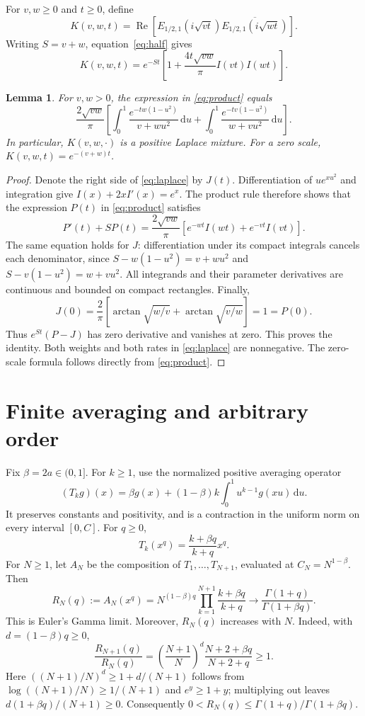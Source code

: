 \documentclass[11pt]{article}
\newtheorem{lemma}[theorem]{Lemma}
\newcommand{\dd}{\,\mathrm{d}}
\begin{document}
For $v,w\geq0$ and $t\geq0$, define
\[
 K(v,w,t)=\operatorname{Re}\!\left[
 E_{1/2,1}(i\sqrt{vt})\overline{E_{1/2,1}(i\sqrt{wt})}\right].
\]
Writing $S=v+w$, equation~\eqref{eq:half} gives
\begin{equation}\label{eq:product}
 K(v,w,t)=e^{-St}\left[1+\frac{4t\sqrt{vw}}{\pi}I(vt)I(wt)\right].
\end{equation}
\begin{lemma}\label{lem:kernel}
For $v,w>0$, the expression in \eqref{eq:product} equals
\begin{equation}\label{eq:laplace}
 \frac{2\sqrt{vw}}{\pi}\left[
 \int_0^1\frac{e^{-tw(1-u^2)}}{v+wu^2}\dd u+
 \int_0^1\frac{e^{-tv(1-u^2)}}{w+vu^2}\dd u\right].
\end{equation}
In particular, $K(v,w,\cdot)$ is a positive Laplace mixture.
For a zero scale, $K(v,w,t)=e^{-(v+w)t}$.
\end{lemma}
\begin{proof}
Denote the right side of \eqref{eq:laplace} by $J(t)$. Differentiation of
$u e^{xu^2}$ and integration give $I(x)+2xI'(x)=e^x$. The product rule
therefore shows that the expression $P(t)$ in \eqref{eq:product} satisfies
\[
 P'(t)+SP(t)=\frac{2\sqrt{vw}}{\pi}
 \left[e^{-wt}I(wt)+e^{-vt}I(vt)\right].
\]
The same equation holds for $J$: differentiation under its compact
integrals cancels each denominator, since
$S-w(1-u^2)=v+wu^2$ and $S-v(1-u^2)=w+vu^2$.
All integrands and their parameter derivatives are continuous and bounded
on compact rectangles. Finally,
\[
 J(0)=\frac2\pi\left[\arctan\sqrt{w/v}+\arctan\sqrt{v/w}\right]=1=P(0).
\]
Thus $e^{St}(P-J)$ has zero derivative and vanishes at zero.
This proves the identity. Both weights and both rates in
\eqref{eq:laplace} are nonnegative. The zero-scale formula follows
directly from \eqref{eq:product}.
\end{proof}

\section{Finite averaging and arbitrary order}
Fix $\beta=2a\in(0,1]$. For $k\geq1$, use the normalized positive averaging
operator
\[
 (T_k g)(x)=\beta g(x)+(1-\beta)k\int_0^1u^{k-1}g(xu)\dd u.
\]
It preserves constants and positivity, and is a contraction in the uniform
norm on every interval $[0,C]$. For $q\geq0$,
\[
 T_k(x^q)=\frac{k+\beta q}{k+q}x^q.
\]
For $N\geq1$, let $A_N$ be the composition of $T_1,\ldots,T_{N+1}$,
evaluated at $C_N=N^{1-\beta}$. Then
\begin{equation}\label{eq:moments}
 R_N(q):=A_N(x^q)=N^{(1-\beta)q}
 \prod_{k=1}^{N+1}\frac{k+\beta q}{k+q}
 \longrightarrow\frac{\Gamma(1+q)}{\Gamma(1+\beta q)}.
\end{equation}
This is Euler's Gamma limit. Moreover, $R_N(q)$ increases with $N$.
Indeed, with $d=(1-\beta)q\geq0$,
\[
 \frac{R_{N+1}(q)}{R_N(q)}
 =\left(\frac{N+1}{N}\right)^d\frac{N+2+\beta q}{N+2+q}\geq1.
\]
Here $((N+1)/N)^d\geq1+d/(N+1)$ follows from
$\log((N+1)/N)\geq1/(N+1)$ and $e^y\geq1+y$; multiplying out leaves
$d(1+\beta q)/(N+1)\geq0$.
Consequently $0<R_N(q)\leq\Gamma(1+q)/\Gamma(1+\beta q)$.
\end{document}
